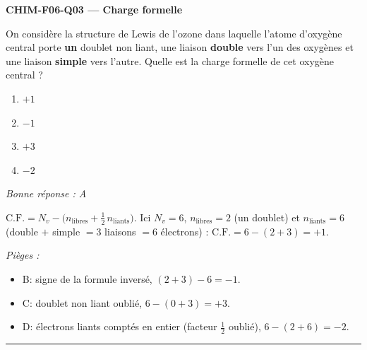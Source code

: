 \documentclass[11pt,a4paper]{article}
\begin{document}
\noindent\textbf{CHIM-F06-Q03 --- Charge formelle}\par
On considère la structure de Lewis de l'ozone  dans laquelle l'atome d'oxygène central porte
\textbf{un} doublet non liant, une liaison \textbf{double} vers l'un des oxygènes et une liaison
\textbf{simple} vers l'autre. Quelle est la charge formelle de cet oxygène central ?
\begin{enumerate}[label=\Alph*)]
\item $+1$
\item $-1$
\item $+3$
\item $-2$
\end{enumerate}
\textit{Bonne réponse : A}\par
$\mathrm{C.F.} = N_v - \big(n_{\text{libres}} + \tfrac12\,n_{\text{liants}}\big)$. Ici $N_v=6$,
$n_{\text{libres}}=2$ (un doublet) et $n_{\text{liants}}=6$ (double $+$ simple $=3$ liaisons $=6$
électrons) : $\mathrm{C.F.} = 6-(2+3) = +1$.\par
\textit{Pièges :}
\begin{itemize}
\item B: signe de la formule inversé, $(2+3)-6=-1$.
\item C: doublet non liant oublié, $6-(0+3)=+3$.
\item D: électrons liants comptés en entier (facteur $\tfrac12$ oublié), $6-(2+6)=-2$.
\end{itemize}
\vspace{8pt}\hrule\vspace{8pt}
\end{document}
